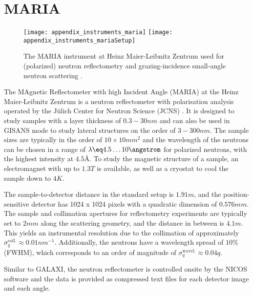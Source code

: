 \documentclass[\main/dresen_thesis.tex]{subfiles}
\begin{document}
  \section{MARIA}\label{ch:lss:maria}
    \begin{figure}[ht]
      \centering
      \texttt{[image: appendix\_instruments\_maria]}
      \texttt{[image: appendix\_instruments\_mariaSetup]}
      \caption{\label{fig:lss:maria}The MARIA instrument at Heinz Maier-Leibnitz Zentrum used for (polarized) neutron reflectometry and grazing-incidence small-angle neutron scattering \cite{Heinz_2015_Maria}.}
    \end{figure}

    The MAgnetic Reflectometer with high Incident Angle (MARIA) at the Heinz Maier-Leibnitz Zentrum is a neutron reflectometer with polarisation analysis operated by the J\"ulich Center for Neutron Science (JCNS) \cite{Heinz_2015_Maria}.
    It is designed to study samples with a layer thickness of $0.3 - 30 \unit{nm}$ and can also be used in GISANS mode to study lateral structures on the order of $3 - 300 \unit{nm}$.
    The sample sizes are typically in the order of $10 \times 10 \unit{mm^2}$ and the wavelength of the neutrons can be chosen in a range of $\lambda \eq 4.5 \ldots 10 \angstrom$ for polarized neutrons, with the highest intensity at $4.5 \unit{\angstrom}$.
    To study the magnetic structure of a sample, an electromagnet with up to $1.3 \unit{T}$ is available, as well as a cryostat to cool the sample down to $4 \unit{K}$.

    The sample-to-detector distance in the standard setup is $1.91 \unit{m}$, and the position-sensitive detector has 1024 x 1024 pixels with a quadratic dimension of $0.576 \unit{mm}$.
    The sample and collimation apertures for reflectometry experiments are typically set to $2 \unit{mm}$ along the scattering geometry, and the distance in between is $4.1 \unit{m}$.
    This yields an instrumental resolution due to the collimation of approximately $\sigma_q^\mathrm{coll.} \approx 0.01\unit{nm}^{-1}$.
    Additionally, the neutrons have a wavelength spread of $10 \unit{\%}$ (FWHM), which corresponds to an order of magnitude of $\sigma_q^\mathrm{wavel.} \approx 0.04 q$.

    Similar to GALAXI, the neutron reflectometer is controlled onsite by the NICOS software and the data is provided as compressed text files for each detector image and each angle.
\end{document}
